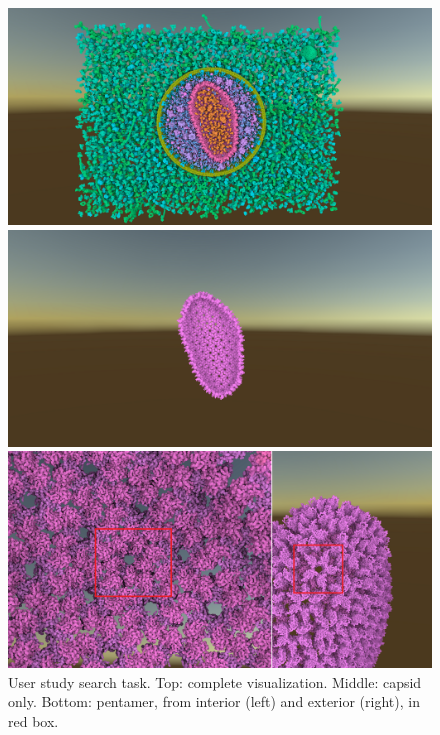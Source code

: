 \documentclass{article}
\begin{document}
	
	
	\begin{figure}[t]
		\centering
		\includegraphics[width=0.95\linewidth,keepaspectratio]{supplementaryMaterial/userfull} 
		
		\vspace{0.1cm}
		
		\includegraphics[width=0.95\linewidth,keepaspectratio]{supplementaryMaterial/usercapsid} 
		
		\vspace{0.1cm}
		
		\includegraphics[width=0.95\linewidth,keepaspectratio]{supplementaryMaterial/bothpentamer} 
		\caption{User study search task. Top: complete visualization. Middle: capsid only. Bottom: pentamer, from interior (left) and exterior (right), in red box.}
	\end{figure}
	
\end{document}
